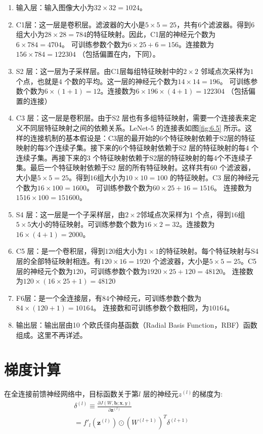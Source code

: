 \documentclass[11pt,fleqn, UTF8]{ctexbook} %
\begin{document}
\begin{enumerate}
  \item 输入层：输入图像大小为$32 \times 32 = 1024$。
  \item C1层：这一层是卷积层。滤波器的大小是$5\times 5 = 25$，共有$6$个滤波器。得到$6$组大小为$28 \times 28 = 784$的特征映射。因此，C1层的神经元个数为$6 \times 784 = 4704$。 可训练参数个数为$6 \times 25 + 6 = 156$。连接数为$156 \times 784 = 122304$ （包括偏置在内，下同）。
  \item S2 层：这一层为子采样层。由C1层每组特征映射中的$2\times 2$ 邻域点次采样为$1$ 个点，也就是$4$ 个数的平均。这一层的神经元个数为$14 \times 14 = 196$。 可训练参数个数为$6 \times (1 + 1) = 12$。连接数为$6 \times 196 \times (4 + 1) = 122304$ （包括偏置的连接）
  \item C3 层：这一层是卷积层。由于S2 层也有多组特征映射，需要一个连接表来定义不同层特征映射之间的依赖关系。LeNet-5 的连接表如图\ref{fig:6.5} 所示。这样的连接机制的基本假设是：C3层的最开始的$6$个特征映射依赖于S2层的特征映射的每$3$个连续子集。接下来的$6$个特征映射依赖于S2 层的特征映射的每$4$ 个连续子集。再接下来的3 个特征映射依赖于S2层的特征映射的每$4$个不连续子集。最后一个特征映射依赖于S2 层的所有特征映射。这样共有$60$ 个滤波器，大小是$5 \times 5 = 25$。得到$16$组大小为$10\times 10 = 100$ 的特征映射。C3 层的神经元个数为$16 \times 100 = 1600$。 可训练参数个数为$60 \times 25 + 16 = 1516$。 连接数为$1516 \times 100 = 151600$。
  \item S4 层：这一层是一个子采样层，由$2\times 2$邻域点次采样为$1$ 个点，得到$16$组$5\times 5$大小的特征映射。可训练参数个数为$16 \times 2 = 32$。连接数为$16 \times (4 + 1) = 2000$。
  \item C5 层：是一个卷积层，得到$120$组大小为$1 \times 1$的特征映射。每个特征映射与S4 层的全部特征映射相连。有$120 \times 16 = 1920$ 个滤波器，大小是$5 \times 5 = 25$。C5 层的神经元个数为$120$，可训练参数个数为$1920 \times 25 + 120 = 48120$。 连接数为$120 \times (16 \times 25+1)=48120$
  \item F6层：是一个全连接层，有$84$个神经元，可训练参数个数为$84\times (120+1) = 10164$。 连接数和可训练参数个数相同，为$10164$。
  \item 输出层：输出层由10 个欧氏径向基函数（Radial Basis Function，RBF）函数组成。这里不再详述。
\end{enumerate}


\section{梯度计算}
在全连接前馈神经网络中，目标函数关于第$l$ 层的神经元$z^{(l)}$的梯度为:
\begin{gather}\label{6.16}
  \delta ^{(l)}\equiv \frac{\partial J(W,\boldsymbol{b};\boldsymbol{x},y)}{\partial \boldsymbol{z}^{(l)}} \\
  =f'_l(\boldsymbol{z}^{(l)})\odot (W^{(l+1)})^T\delta^{(l+1)}
\end{gather}
\end{document}

